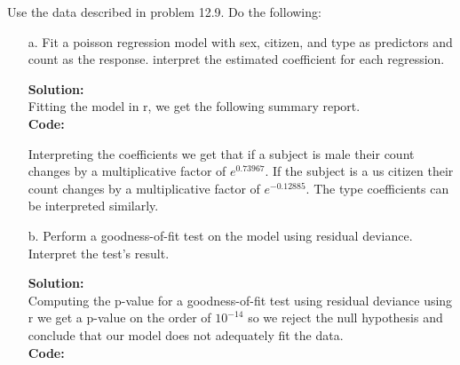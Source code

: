 \documentclass[12pt]{article}
\makeatletter
\theoremstyle{homework}
\newenvironment{exercise}[1]
{\def\@currentlabel{#1}\exercisecore}
{\endexercisecore}
\newcommand{\localhead}[1]{\par\smallskip\noindent\textbf{#1}\nobreak\\}%
\newcommand\solution{\localhead{Solution:}}
\makeatother
\begin{document}
\begin{exercise}{3} Use the data described in problem 12.9. Do the following:
  \begin{enumerate}
    \item[a.] Fit a poisson regression model with sex, citizen, and type as predictors and count as the response. interpret the 
    estimated coefficient for each regression.\\
    \solution  Fitting the model in r, we get the following summary report.\\
    \textbf{Code:}
    \begin{center}
    
    \end{center}
    Interpreting the coefficients we get that if a subject is male their count changes by a multiplicative factor of $e^{0.73967}$.
    If the subject is a us citizen their count changes by a multiplicative factor of $e^{-0.12885}$. The type coefficients can be interpreted similarly. 
    \newpage

    \item[b.] Perform a goodness-of-fit test on the model using residual deviance. Interpret the test's result. \\
    \solution Computing the p-value for a goodness-of-fit test using residual deviance using r we get a p-value on the order of $10^{-14}$
    so we reject the null hypothesis and conclude that our model does not adequately fit the data. \\
    \textbf{Code:}
    \begin{center}
    
    \end{center} 
  \end{enumerate}
  
\end{exercise}
\end{document}

